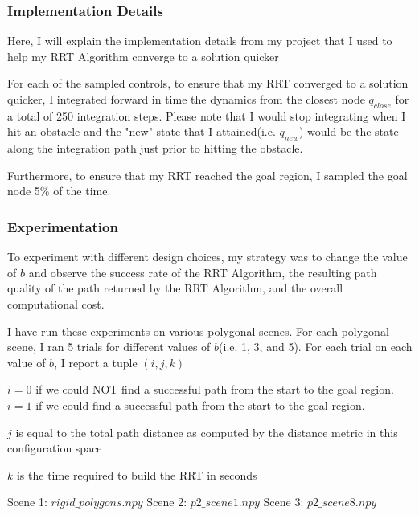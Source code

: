 \documentclass{article}
\begin{document}
\subsubsection{Implementation Details}
Here, I will explain the implementation details from my project that I used to help my RRT Algorithm converge to a solution quicker \newline 

For each of the sampled controls, to ensure that my RRT converged to a solution quicker, I integrated forward in time the dynamics from the closest node $q_{close}$ for a total of 250 integration steps. Please note that I would stop integrating when I hit an obstacle and the "new" state that I attained(i.e. $q_{new}$) would be the state along the integration path just prior to hitting the obstacle.  \newline 

Furthermore, to ensure that my RRT reached the goal region, I sampled the goal node 5\% of the time. 

\subsubsection{Experimentation}
To experiment with different design choices, my strategy was to change the value of $b$ and observe the success rate of the RRT Algorithm, the resulting path quality of the path returned by the RRT Algorithm, and the overall computational cost. 

I have run these experiments on various polygonal scenes. For each polygonal scene, I ran 5 trials for different values of $b$(i.e. 1, 3, and 5). For each trial on each value of $b$, I report a tuple $(i, j, k)$ \newline 

$i = 0$ if we could NOT find a successful path from the start to the goal region. $i = 1$ if we could find a successful path from the start to the goal region. \newline 

$j$ is equal to the total path distance as computed by the distance metric in this configuration space \newline 

$k$ is the time required to build the RRT in seconds \newline 

Scene 1: $rigid\_polygons.npy$ \newline 
Scene 2: $p2\_scene1.npy$ \newline 
Scene 3: $p2\_scene8.npy$ \newline 
\end{document}
